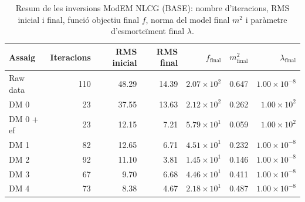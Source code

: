 \begin{table}[htbp]
  \centering
  \caption{Resum de les inversions ModEM NLCG (BASE): nombre d'iteracions, RMS inicial i final, funció objectiu final $f$, norma del model final $m^2$ i paràmetre d'esmorteïment final $\lambda$.}
  \label{tab:modem_runs_base}
  \begin{tabular}{l r r r r r r}
    \toprule
    Assaig & Iteracions & RMS inicial & RMS final & $f_\text{final}$ & $m^2_\text{final}$ & $\lambda_\text{final}$ \\
    \midrule
    Raw data & 110 & 48.29 & 14.39 & $2.07\times10^{2}$ & 0.647 & $1.00\times10^{-8}$ \\
    DM 0 & 23 & 37.55 & 13.63 & $2.12\times10^{2}$ & 0.262 & $1.00\times10^{2}$ \\
    DM 0 + ef & 23 & 12.15 & 7.21 & $5.79\times10^{1}$ & 0.059 & $1.00\times10^{2}$ \\
    DM 1 & 82 & 12.65 & 6.71 & $4.51\times10^{1}$ & 0.232 & $1.00\times10^{-8}$ \\
    DM 2 & 92 & 11.10 & 3.81 & $1.45\times10^{1}$ & 0.146 & $1.00\times10^{-8}$ \\
    DM 3 & 67 & 9.70 & 6.68 & $4.46\times10^{1}$ & 0.411 & $1.00\times10^{-8}$ \\
    DM 4 & 73 & 8.38 & 4.67 & $2.18\times10^{1}$ & 0.487 & $1.00\times10^{-8}$ \\
    \bottomrule
  \end{tabular}
\end{table}
